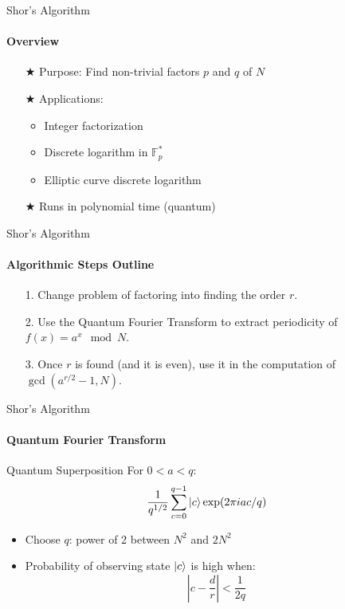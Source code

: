 \documentclass{beamer}
\begin{document}
\begin{frame}{Shor's Algorithm}
	\framesubtitle{Overview}
    \begin{itemize}
        \item[$\bigstar$] Purpose: Find non-trivial factors \(p\) and \(q\) of \(N\)
        \item[$\bigstar$] Applications:
            \begin{itemize}
                \item Integer factorization
                \item Discrete logarithm in \(\mathbb{F}_p^*\)
                \item Elliptic curve discrete logarithm
            \end{itemize}
        \item[$\bigstar$] Runs in polynomial time (quantum)
    \end{itemize}
\end{frame}




\begin{frame}{Shor's Algorithm}
	\framesubtitle{Algorithmic Steps Outline}
	\begin{itemize}
		\item[1.] Change problem of factoring into finding the order \(r\).
		\pause
		\item[2.] Use the Quantum Fourier Transform to extract periodicity of \(f(x) = a^x \mod N\).
		\pause
		\item[3.] Once \(r\) is found (and it is even), use it in the computation of \(\gcd(a^{r/2} - 1, N)\).   
	\end{itemize}
	
\end{frame}




\begin{frame}{Shor's Algorithm}
	\framesubtitle{Quantum Fourier Transform}
    \begin{block}{Quantum Superposition}
        For \(0 < a < q\):
        \[ \frac{1}{q^{1/2}} \sum_{c = 0}^{q - 1} \ket{c} \exp(2\pi i a c /q) \]
    \end{block}
    \begin{itemize}
        \item Choose \(q\): power of 2 between \(N^2\) and \(2N^2\)
        \item Probability of observing state \(\ket{c}\) is high when:
        \[ \left| c - \frac{d}{r} \right| < \frac{1}{2q} \]
    \end{itemize}
\end{frame}
\end{document}
